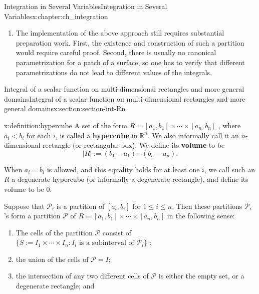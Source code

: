 \documentclass[oneside,10pt,]{book}
\newcommand{\terminology}[1]{\textbf{#1}}
\newcommand{\bbR}{\mathbb R}
\newcommand{\cP}{\mathcal{P}}
\begin{document}
\begin{chapterptx}{Integration in Several Variables}{}{Integration in Several Variables}{}{}{x:chapter:ch_integration}
\begin{introduction}{}
\begin{enumerate}
\item{}The implementation of the above approach still requires substantial preparation work. First, the existence and construction of such a partition would require careful proof. Second, there is usually no canonical parametrization for a patch of a surface, so one has to verify that different parametrizations do not lead to different values of the integrals.%
\end{enumerate}
\end{introduction}%
%
%
\typeout{************************************************}
\typeout{************************************************}
%
\begin{sectionptx}{Integral of a scalar function on multi-dimensional rectangles and more general domains}{}{Integral of a scalar function on multi-dimensional rectangles and more general domains}{}{}{x:section:section-int-Rn}
\begin{definition}{}{x:definition:hypercube}%
%
%
%
\label{g:notation:idm411032582544}%
A set of the form \(R=[a_{1}, b_{1}]\times \cdots \times [a_{n}, b_{n}]\) , where \(a_{i} < b_{i}\) for each \(i\), is called a \terminology{hypercube} in \(\bbR^{n}\). We also informally call it an \(n\)-dimensional rectangle (or rectangular box). We define its \terminology{volume} to be%
\begin{equation*}
|R| := (b_{1}-a_{1})\cdots (b_{n}-a_{n}).
\end{equation*}
%
\par
When \(a_{i}=b_{i}\) is allowed, and this equality holds for at least one \(i\), we call such an \(R\) a degenerate hypercube (or informally a degenerate rectangle), and define its volume to be \(0\).%
\par
Suppose that \(\cP_{i}\) is a partition of \([a_{i}, b_{i}]\) for \(1\le i \le n\). Then these partitions \(\cP_{i}\)'s form a partition \(\cP\) of \(R=[a_{1}, b_{1}]\times \cdots \times [a_{n}, b_{n}]\) in the following sense:%
\begin{enumerate}[label=(\roman*).]
\item{}The cells of the partition \(\cP\) consist of  \(\{S:=I_{1}\times\cdots \times I_{n}: I_{i} \text{ is a subinterval of  } \cP_{i}\}\) ;%
\item{}the union of the cells of \(\cP =I\);%
\item{}the intersection of any two different cells of \(\cP\)  is either the empty set, or a degenerate rectangle; and%

\end{enumerate}
\end{definition}
\end{sectionptx}
\end{chapterptx}
\end{document}
